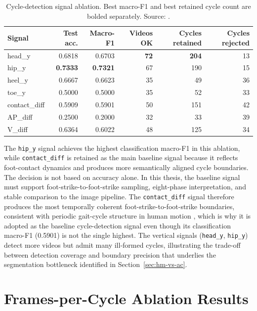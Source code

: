 \begin{table}[htbp]
\centering
\caption[Cycle-detection signal ablation. Source: \protect{}.]{Cycle-detection signal ablation. Best macro-F1 and best retained cycle count are bolded separately. Source: .}
\label{tab:signal}
\small
\begin{tabular}{lrrrrr}
\toprule
Signal & Test acc. & Macro-F1 & Videos OK & Cycles retained & Cycles rejected \\
\midrule
head\_y & 0.6818 & 0.6703 & \textbf{72} & \textbf{204} & 13 \\
hip\_y & \textbf{0.7333} & \textbf{0.7321} & 67 & 190 & 15 \\
heel\_y & 0.6667 & 0.6623 & 35 & 49 & 36 \\
toe\_y & 0.5000 & 0.5000 & 35 & 52 & 33 \\
contact\_diff & 0.5909 & 0.5901 & 50 & 151 & 42 \\
AP\_diff & 0.2500 & 0.2000 & 32 & 33 & 39 \\
V\_diff & 0.6364 & 0.6022 & 48 & 125 & 34 \\
\bottomrule
\end{tabular}
\end{table}

The \texttt{hip\_y} signal achieves the highest classification macro-F1 in this
ablation, while \texttt{contact\_diff} is retained as the main baseline signal
because it reflects foot-contact dynamics and produces more semantically
aligned cycle boundaries. The decision is not based on accuracy alone. In this
thesis, the baseline signal must support foot-strike-to-foot-strike sampling,
eight-phase interpretation, and stable comparison to the image pipeline. The
\texttt{contact\_diff} signal therefore produces the most temporally coherent
foot-strike-to-foot-strike boundaries, consistent with periodic gait-cycle structure in human motion \cite{cutting1978gaitperiodicity,plotnik2007gaitasymmetry}, which is why it is adopted as the
baseline cycle-detection signal even though its classification macro-F1
(0.5901) is not the single highest. The vertical signals
(\texttt{head\_y}, \texttt{hip\_y}) detect more videos but admit many
ill-formed cycles, illustrating the trade-off between detection coverage and
boundary precision that underlies the segmentation bottleneck identified in
Section~\ref{sec:hm-vs-ac}.

\section{Frames-per-Cycle Ablation Results}
\label{sec:frames-ablation}


